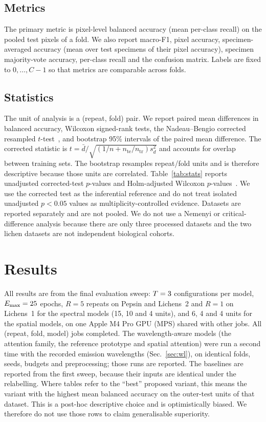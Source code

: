 \documentclass[journal]{IEEEtran}
\begin{document}
\subsection{Metrics}
The primary metric is pixel-level balanced accuracy (mean per-class recall) on the pooled test pixels of a fold. We also report macro-F1, pixel accuracy, specimen-averaged accuracy (mean over test specimens of their pixel accuracy), specimen majority-vote accuracy, per-class recall and the confusion matrix. Labels are fixed to $0,\dots,C-1$ so that metrics are comparable across folds.

\subsection{Statistics}\label{sec:stats}
The unit of analysis is a (repeat, fold) pair. We report paired mean differences in balanced accuracy, Wilcoxon signed-rank tests, the Nadeau--Bengio corrected resampled $t$-test~\cite{nadeau2003inference}, and bootstrap 95\% intervals of the paired mean difference. The corrected statistic is $t=\bar d/\sqrt{(1/n+n_{\mathrm{te}}/n_{\mathrm{tr}})s_d^2}$ and accounts for overlap between training sets. The bootstrap resamples repeat/fold units and is therefore descriptive because those units are correlated. Table~\ref{tab:stats} reports unadjusted corrected-test $p$-values and Holm-adjusted Wilcoxon $p$-values~\cite{holm1979simple}. We use the corrected test as the inferential reference and do not treat isolated unadjusted $p<0.05$ values as multiplicity-controlled evidence. Datasets are reported separately and are not pooled. We do not use a Nemenyi or critical-difference analysis because there are only three processed datasets and the two lichen datasets are not independent biological cohorts.

\section{Results}\label{sec:results}
All results are from the final evaluation sweep: $T=3$ configurations per model, $E_{\max}=25$ epochs, $R=5$ repeats on Pepsin and Lichens~2 and $R=1$ on Lichens~1 for the spectral models (15, 10 and 4 units), and 6, 4 and 4 units for the spatial models, on one Apple M4 Pro GPU (MPS) shared with other jobs. All (repeat, fold, model) jobs completed. The wavelength-aware models (the attention family, the reference prototype and spatial attention) were run a second time with the recorded emission wavelengths (Sec.~\ref{sec:wl}), on identical folds, seeds, budgets and preprocessing; those runs are reported. The baselines are reported from the first sweep, because their inputs are identical under the relabelling. Where tables refer to the ``best'' proposed variant, this means the variant with the highest mean balanced accuracy on the outer-test units of that dataset. This is a post-hoc descriptive choice and is optimistically biased. We therefore do not use those rows to claim generalisable superiority.
\end{document}
